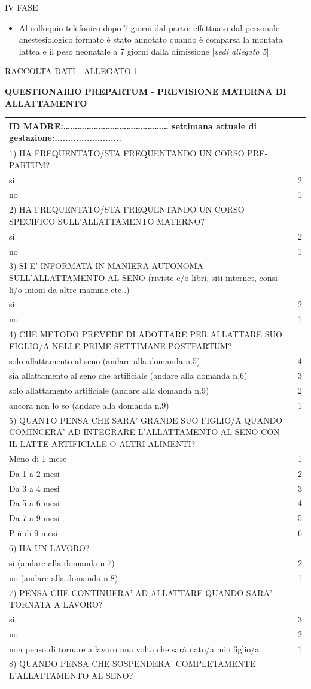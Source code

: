 \documentclass[]{article}
\begin{document}
{IV FASE}

\begin{itemize}
\item
  {Al colloquio telefonico dopo 7 giorni dal parto}: effettuato dal
  personale anestesiologico formato è stato annotato quando è comparsa
  la montata lattea e il peso neonatale a 7 giorni dalla dimissione
  {[}\emph{vedi allegato 5}{]}.
\end{itemize}

{RACCOLTA DATI - ALLEGATO 1}

\textbf{{QUESTIONARIO PREPARTUM - PREVISIONE MATERNA DI ALLATTAMENTO}}

\begin{longtable}[]{@{}ll@{}}
\toprule
ID
MADRE:\ldots{}\ldots{}\ldots{}\ldots{}\ldots{}\ldots{}\ldots{}\ldots{}\ldots{}\ldots{}\ldots{}\ldots{}\ldots{}\ldots{}\ldots{}
settimana attuale di gestazione:.........................
&\tabularnewline
\midrule
\endhead
1) HA FREQUENTATO/STA FREQUENTANDO UN CORSO PRE-PARTUM? &\tabularnewline
si & 2\tabularnewline
no & 1\tabularnewline
2) HA FREQUENTATO/STA FREQUENTANDO UN CORSO SPECIFICO SULL'ALLATTAMENTO
MATERNO? &\tabularnewline
si & 2\tabularnewline
no & 1\tabularnewline
3) SI E' INFORMATA IN MANIERA AUTONOMA SULL'ALLATTAMENTO AL SENO
(riviste e/o libri, siti internet, consi li/o inioni da altre mamme
etc..) &\tabularnewline
si & 2\tabularnewline
no & 1\tabularnewline
4) CHE METODO PREVEDE DI ADOTTARE PER ALLATTARE SUO FIGLIO/A NELLE PRIME
SETTIMANE POSTPARTUM? &\tabularnewline
solo allattamento al seno {(andare alla domanda n.5)} & 4\tabularnewline
sia allattamento al seno che artificiale {(andare alla domanda n.6}) &
3\tabularnewline
solo allattamento artificiale {(andare alla domanda n.9)} &
2\tabularnewline
ancora non lo so {(andare alla domanda n.9)} & 1\tabularnewline
5) QUANTO PENSA CHE SARA' GRANDE SUO FIGLIO/A QUANDO COMINCERA' AD
INTEGRARE L'ALLATTAMENTO AL SENO CON IL LATTE ARTIFICIALE O ALTRI
ALIMENTI? &\tabularnewline
Meno di 1 mese & 1\tabularnewline
Da 1 a 2 mesi & 2\tabularnewline
Da 3 a 4 mesi & 3\tabularnewline
Da 5 a 6 mesi & 4\tabularnewline
Da 7 a 9 mesi & 5\tabularnewline
Più di 9 mesi & 6\tabularnewline
6) HA UN LAVORO? &\tabularnewline
si {(andare alla domanda n.7) } & 2\tabularnewline
no {(andare alla domanda n.8)} & 1\tabularnewline
7) PENSA CHE CONTINUERA' AD ALLATTARE QUANDO SARA' TORNATA A LAVORO?
&\tabularnewline
si & 3\tabularnewline
no & 2\tabularnewline
non penso di tornare a lavoro una volta che sarà nato/a mio figlio/a &
1\tabularnewline
8) QUANDO PENSA CHE SOSPENDERA' COMPLETAMENTE L'ALLATTAMENTO AL SENO?

\end{longtable}
\end{document}
